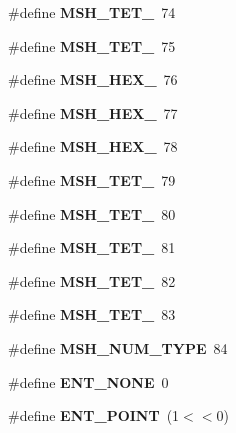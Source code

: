 \begin{DoxyCompactItemize}
\item 
\#define {\bfseries M\-S\-H\-\_\-\-T\-E\-T\-\_}~74\label{GmshDefines_8h_a7e01f405b83143085a2db735167acdf3}

\item 
\#define {\bfseries M\-S\-H\-\_\-\-T\-E\-T\-\_}~75\label{GmshDefines_8h_af5a4bf3b08fbb623cf160e0657a3abbf}

\item 
\#define {\bfseries M\-S\-H\-\_\-\-H\-E\-X\-\_}~76\label{GmshDefines_8h_a64d29c73b1ba83ee643f0f2b46c2ac44}

\item 
\#define {\bfseries M\-S\-H\-\_\-\-H\-E\-X\-\_}~77\label{GmshDefines_8h_a5e0120e7abb654d440c65c35cf6def70}

\item 
\#define {\bfseries M\-S\-H\-\_\-\-H\-E\-X\-\_}~78\label{GmshDefines_8h_aaf5d520485d1f70e700851e7251b9ddf}

\item 
\#define {\bfseries M\-S\-H\-\_\-\-T\-E\-T\-\_}~79\label{GmshDefines_8h_add07b1903ba76a8d8f49752e1a9ce379}

\item 
\#define {\bfseries M\-S\-H\-\_\-\-T\-E\-T\-\_}~80\label{GmshDefines_8h_af97bc7dbdc4813152f8e0327d8fef0a0}

\item 
\#define {\bfseries M\-S\-H\-\_\-\-T\-E\-T\-\_}~81\label{GmshDefines_8h_a1f2476fced65d86061a9078d8e2123ee}

\item 
\#define {\bfseries M\-S\-H\-\_\-\-T\-E\-T\-\_}~82\label{GmshDefines_8h_ad8c76b72cc61452c87e4c488dfb32be7}

\item 
\#define {\bfseries M\-S\-H\-\_\-\-T\-E\-T\-\_}~83\label{GmshDefines_8h_a61a202c41a5485c29234768828fa206c}

\item 
\#define {\bfseries M\-S\-H\-\_\-\-N\-U\-M\-\_\-\-T\-Y\-P\-E}~84\label{GmshDefines_8h_aa2bb8ab0802ff632bec96d52cc74ec6a}

\item 
\#define {\bfseries E\-N\-T\-\_\-\-N\-O\-N\-E}~0\label{GmshDefines_8h_a825db418c2c07c5e614ee7158fc63b46}

\item 
\#define {\bfseries E\-N\-T\-\_\-\-P\-O\-I\-N\-T}~(1$<$$<$0)\label{GmshDefines_8h_ac1d647831913fcd3ed6754bbb413d229}


\end{DoxyCompactItemize}
